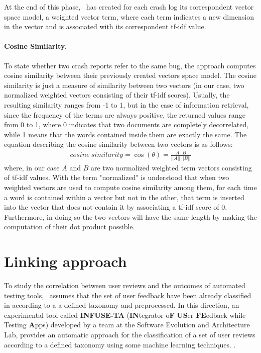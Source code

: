 At the end of this phase, \toolname\ has created for each crash log its correspondent vector space model, \ie a weighted vector term, where each term indicates a new dimension in the vector and is associated with its correspondent tf-idf value. 


\paragraph{Cosine Similarity.}
\label{sec:cosine_similarity}
To state whether two crash reports refer to the same bug, the approach computes cosine similarity between their previously created vectors space model. 
The cosine similarity is just a measure of similarity between two vectors \cite{cosine} (in our case, two normalized weighted vectors consisting of their tf-idf scores).
Usually, the resulting similarity ranges from -1 to 1, but in the case of information retrieval, since the frequency of the terms are always positive, the returned values range from 0 to 1, where 0 indicates that two documents are completely decorrelated, while 1 means that the words contained inside them are exactly the same.  
The equation describing the cosine similarity between two vectors is as follows: 
\begin{align*}
cosine\:similarity = \cos({\theta}) = \frac{A\cdot{B}}{||A||\:||B||}
\end{align*}
where, in our case $A$ and $B$ are two normalized weighted term vectors consisting of tf-idf values. 
With the term "normalized" is understood that when two weighted vectors are used to compute cosine similarity among them, for each time a word is contained within a vector but not in the other, that term is inserted into the vector that does not contain it by associating a tf-idf score of 0. Furthermore, in doing so the two vectors will have the same length by making the computation of their dot product possible. 



\section{Linking approach}
\label{approach:linking}
\label{par: infusa}
To study the correlation between user reviews and the outcomes of automated testing tools, \toolname\ assumes that the set of user feedback have been already classified in according to a a defined taxonomy and preprocessed.
In this direction, an experimental tool called  \textbf{INFUSE-TA} (\textbf{IN}tegrator o\textbf{F} \textbf{US}er \textbf{FE}edback while Testing \textbf{A}pps) developed by a team at the Software Evolution and Architecture Lab, provides an automatic approach for the classification of a set of user reviews according to a defined taxonomy using some machine learning techniques. 
.

